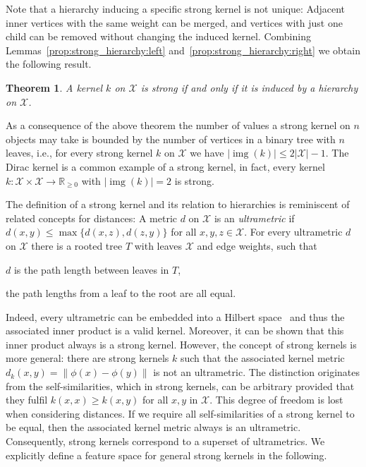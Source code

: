 \documentclass{article}
\newtheorem{theorem}{Theorem}
\newcommand{\norm}[1]{\left\lVert#1\right\rVert}
\newcommand{\X}{\ensuremath{\mathcal{X}}\xspace}
\newcommand{\bbRnn}[0]{\ensuremath{\mathbb{R}_{\geq0}}\xspace}
\DeclareMathOperator{\img}{img}
\begin{document}
Note that a hierarchy inducing a specific strong kernel is not unique: 
Adjacent inner vertices with the same weight can be merged, and vertices with 
just one child can be removed without changing the induced kernel. 
Combining Lemmas~\ref{prop:strong_hierarchy:left} and~\ref{prop:strong_hierarchy:right}
we obtain the following result.
\begin{theorem}\label{thm:strong_hierarchy}
 A kernel $k$ on \X is strong if and only if it is induced by a hierarchy on \X.
\end{theorem}

As a consequence of the above theorem the number of values a strong kernel 
on $n$ objects may take is bounded by the number of vertices in a binary tree 
with $n$ leaves, i.e., for every strong kernel $k$ on \X we have $|\img(k)| \leq 2|\X|-1$.
The Dirac kernel is a common example of a strong kernel, in fact, every kernel 
$k : \X \times \X \to \bbRnn$ with $|\img(k)|=2$ is strong.

The definition of a strong kernel and its relation to hierarchies is reminiscent 
of related concepts for distances: A metric $d$ on \X is an \emph{ultrametric}
if $d(x,y)\leq \max\{d(x,z),d(z,y)\}$ for all $x,y,z\in \X$. 
For every ultrametric $d$ on \X there is a rooted tree $T$ with leaves \X and 
edge weights, such that 
\begin{inparaenum}[(i)]
 \item $d$ is the path length between leaves in $T$,
 \item the path lengths from a leaf to the root are all equal.
\end{inparaenum}
Indeed, every ultrametric can be embedded into a Hilbert space~\cite{Ismagilov1997}
and thus the associated inner product is a valid kernel. 
Moreover, it can be shown that this inner product always is a strong kernel.
However, the concept of strong kernels is more general: there are strong kernels 
$k$ such that the associated kernel metric $d_k(x,y) = \norm{\phi(x)-\phi(y)}$
is not an ultrametric.
The distinction originates from the self-similarities, which in strong kernels, 
can be arbitrary provided that they fulfil $k(x,x)\geq k(x,y)$
for all $x,y$ in \X. 
This degree of freedom is lost when considering distances. 
If we require all self-similarities of a strong kernel to be equal, then the 
associated kernel metric always is an ultrametric.
Consequently, strong kernels correspond to a superset of ultrametrics.
We explicitly define a feature space for general strong kernels in the following.
\end{document}
